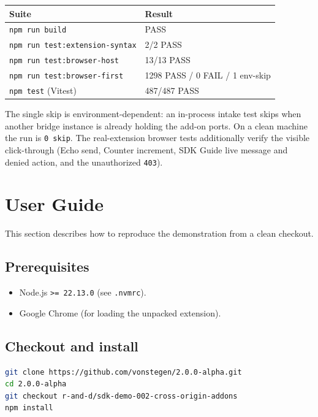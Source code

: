 \documentclass[11pt]{article}
\begin{document}
\begin{center}
\begin{tabular}{@{}p{8.6cm}p{4.6cm}@{}}
\toprule
\textbf{Suite} & \textbf{Result} \\
\midrule
\texttt{npm run build} & PASS \\
\texttt{npm run test:extension-syntax} & 2/2 PASS \\
\texttt{npm run test:browser-host} & 13/13 PASS \\
\texttt{npm run test:browser-first} & 1298 PASS / 0 FAIL / 1 env-skip \\
\texttt{npm test} (Vitest) & 487/487 PASS \\
\bottomrule
\end{tabular}
\end{center}

The single skip is environment-dependent: an in-process intake test skips when
another bridge instance is already holding the add-on ports. On a clean machine
the run is \texttt{0 skip}. The real-extension browser tests additionally
verify the visible click-through (Echo send, Counter increment, SDK Guide live
message and denied action, and the unauthorized \texttt{403}).

\section{User Guide}

This section describes how to reproduce the demonstration from a clean checkout.

\subsection{Prerequisites}

\begin{itemize}[leftmargin=1.5em]
  \item Node.js \texttt{>= 22.13.0} (see \texttt{.nvmrc}).
  \item Google Chrome (for loading the unpacked extension).
\end{itemize}

\subsection{Checkout and install}

\begin{lstlisting}[language=bash]
git clone https://github.com/vonstegen/2.0.0-alpha.git
cd 2.0.0-alpha
git checkout r-and-d/sdk-demo-002-cross-origin-addons
npm install
\end{lstlisting}
\end{document}
